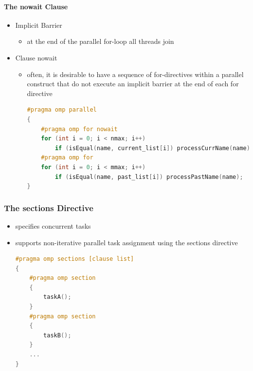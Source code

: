 \hypertarget{the-nowait-clause}{%
\paragraph{The nowait Clause}\label{the-nowait-clause}}

\begin{itemize}
\tightlist
\item
  Implicit Barrier

  \begin{itemize}
  \tightlist
  \item
    at the end of the parallel for-loop all threads join
  \end{itemize}
\item
  Clause nowait

  \begin{itemize}
  \item
    often, it is desirable to have a sequence of for-directives within a
    parallel construct that do not execute an implicit barrier at the
    end of each for directive

\begin{lstlisting}[language=C++]
#pragma omp parallel
{
    #pragma omp for nowait
    for (int i = 0; i < nmax; i++)
        if (isEqual(name, current_list[i]) processCurrName(name);
    #pragma omp for
    for (int i = 0; i < mmax; i++)
        if (isEqual(name, past_list[i]) processPastName(name);
}
\end{lstlisting}
  \end{itemize}
\end{itemize}

\hypertarget{the-sections-directive}{%
\subsubsection{The sections Directive}\label{the-sections-directive}}

\begin{itemize}
\item
  specifies concurrent tasks
\item
  supports non-iterative parallel task assignment using the sections
  directive
  
 \begin{lstlisting}[language=C++]
#pragma omp sections [clause list]
{
    #pragma omp section
    {
        taskA();
    }
    #pragma omp section
    {
        taskB();
    }
    ...
}
 \end{lstlisting}
\end{itemize}

